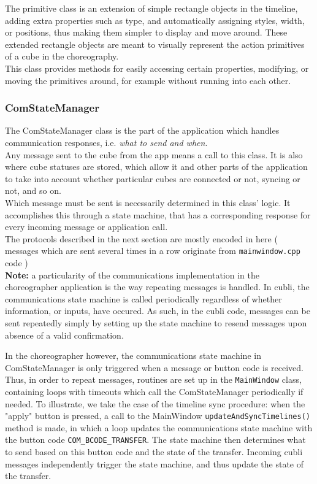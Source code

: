 The primitive class is an extension of simple rectangle objects in the timeline, adding extra properties such as type, and automatically assigning styles, width, or positions, thus making them simpler to display and move around. These extended rectangle objects are meant to visually represent the action primitives of a cube in the choreography.\\

This class provides methods for easily accessing certain properties, modifying, or moving the primitives around, for example without running into each other.

\subsubsection{ComStateManager}

 The ComStateManager class is the part of the application which handles communication responses, i.e. \textit{what to send and when}.\\
 
Any message sent to the cube from the app means a call to this class. It is also where cube statuses are stored, which allow it and other parts of the application to take into account whether particular cubes are connected or not, syncing or not, and so on.\\

Which message must be sent is necessarily determined in this class' logic.
It accomplishes this through a state machine, that has a corresponding response for every incoming message or application call.\\

The protocols described in the next section are mostly encoded in here ( messages which are sent several times in a row originate from \texttt{mainwindow.cpp} code )\\

\textbf{Note:} a particularity of the communications implementation in the choreographer application is the way repeating messages is handled. In cubli, the communications state machine is called periodically regardless of whether information, or inputs, have occured. As such, in the cubli code, messages can be sent repeatedly simply by setting up the state machine to resend messages upon absence of a valid confirmation.

In the choreographer however, the communications state machine in ComStateManager is only triggered when a message or button code is received. Thus, in order to repeat messages, routines are set up in the \texttt{MainWindow} class, containing loops with timeouts which call the ComStateManager periodically if needed. To illustrate, we take the case of the timeline sync procedure: when the "apply" button is pressed, a call to the MainWindow \texttt{updateAndSyncTimelines()} method is made, in which a loop updates the communications state machine with the button code \texttt{COM\_BCODE\_TRANSFER}. The state machine then determines what to send based on this button code and the state of the transfer. Incoming cubli messages independently trigger the state machine, and thus update the state of the transfer.

